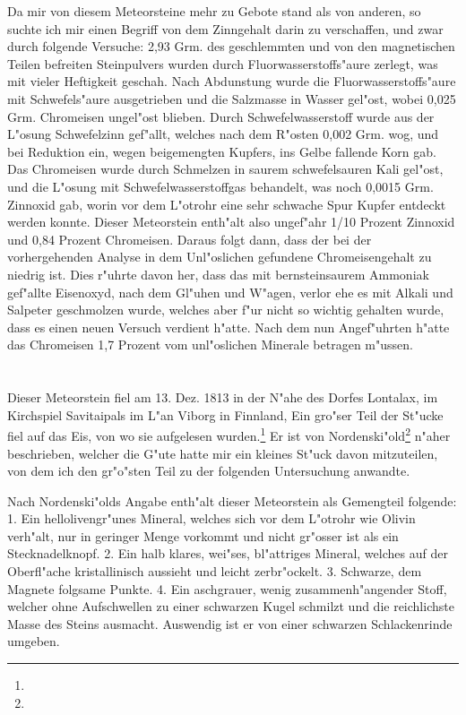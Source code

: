 \documentclass[a4paper, 11pt, oneside]{article}
\begin{document}
Da mir von diesem Meteorsteine mehr zu Gebote stand als von anderen, so suchte ich mir einen Begriff von dem Zinngehalt darin zu verschaffen, und zwar durch folgende Versuche: 2,93 Grm. des geschlemmten und von den magnetischen Teilen befreiten Steinpulvers wurden durch Fluorwasserstoffs"aure zerlegt, was mit vieler Heftigkeit geschah. Nach Abdunstung wurde die Fluorwasserstoffs"aure mit Schwefels"aure ausgetrieben und die Salzmasse in Wasser gel"ost, wobei 0,025 Grm. Chromeisen ungel"ost blieben. Durch Schwefelwasserstoff wurde aus der L"osung Schwefelzinn gef"allt, welches nach dem R"osten 0,002 Grm. wog, und bei Reduktion ein, wegen beigemengten Kupfers, ins Gelbe fallende Korn gab. Das Chromeisen wurde durch Schmelzen in saurem schwefelsauren Kali gel"ost, und die L"osung mit Schwefelwasserstoffgas behandelt, was noch 0,0015 Grm. Zinnoxid gab, worin vor dem L"otrohr eine sehr schwache Spur Kupfer entdeckt werden konnte. Dieser Meteorstein enth"alt also ungef"ahr 1/10 Prozent Zinnoxid und 0,84 Prozent Chromeisen. Daraus folgt dann, dass der bei der vorhergehenden Analyse in dem Unl"oslichen gefundene Chromeisengehalt zu niedrig ist. Dies r"uhrte davon her, dass das mit bernsteinsaurem Ammoniak gef"allte Eisenoxyd, nach dem Gl"uhen und W"agen, verlor ehe es mit Alkali und Salpeter geschmolzen wurde, welches aber f"ur nicht so wichtig gehalten wurde, dass es einen neuen Versuch verdient h"atte. Nach dem nun Angef"uhrten h"atte das Chromeisen 1,7 Prozent vom unl"oslichen Minerale betragen m"ussen.

\section{}
\paragraph{}
Dieser Meteorstein fiel am 13. Dez. 1813 in der N"ahe des Dorfes Lontalax, im Kirchspiel Savitaipals im L"an Viborg in Finnland, Ein gro"ser Teil der St"ucke fiel auf das Eis, von wo sie aufgelesen wurden.\footnote{} Er ist von Nordenski"old\footnote{} n"aher beschrieben, welcher die G"ute hatte mir ein kleines St"uck davon mitzuteilen, von dem ich den gr"o"sten Teil zu der folgenden Untersuchung anwandte.

Nach Nordenski"olds Angabe enth"alt dieser Meteorstein als Gemengteil folgende: 1. Ein hellolivengr"unes Mineral, welches sich vor dem L"otrohr wie Olivin verh"alt, nur in geringer Menge vorkommt und nicht gr"osser ist als ein Stecknadelknopf. 2. Ein halb klares, wei"ses, bl"attriges Mineral, welches auf der Oberfl"ache kristallinisch aussieht und leicht zerbr"ockelt. 3. Schwarze, dem Magnete folgsame Punkte. 4. Ein aschgrauer, wenig zusammenh"angender Stoff, welcher ohne Aufschwellen zu einer schwarzen Kugel schmilzt und die reichlichste Masse des Steins ausmacht. Auswendig ist er von einer schwarzen Schlackenrinde umgeben.
\end{document}
